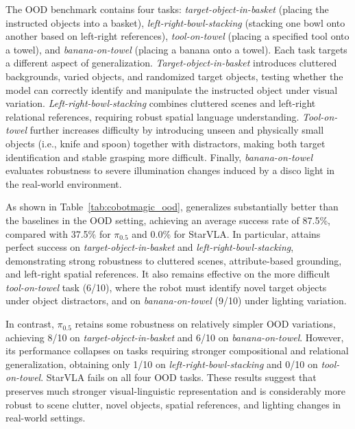 The OOD benchmark contains four tasks: \textit{target-object-in-basket} (placing the instructed objects into a basket), \textit{left-right-bowl-stacking} (stacking one bowl onto another based on left-right references), \textit{tool-on-towel} (placing a specified tool onto a towel), and \textit{banana-on-towel} (placing a banana onto a towel). Each task targets a different aspect of generalization. \textit{Target-object-in-basket} introduces cluttered backgrounds, varied objects, and randomized target objects, testing whether the model can correctly identify and manipulate the instructed object under visual variation. \textit{Left-right-bowl-stacking} combines cluttered scenes and left-right relational references, requiring robust spatial language understanding. \textit{Tool-on-towel} further increases difficulty by introducing unseen and physically small objects (i.e., knife and spoon) together with distractors, making both target identification and stable grasping more difficult. Finally, \textit{banana-on-towel} evaluates robustness to severe illumination changes induced by a disco light in the real-world environment.

As shown in Table~\ref{tab:cobotmagic_ood}, \ours generalizes substantially better than the baselines in the OOD setting, achieving an average success rate of 87.5\%, compared with 37.5\% for $\pi_{0.5}$ and 0.0\% for StarVLA. In particular, \ours attains perfect success on \textit{target-object-in-basket} and \textit{left-right-bowl-stacking}, demonstrating strong robustness to cluttered scenes, attribute-based grounding, and left-right spatial references. It also remains effective on the more difficult \textit{tool-on-towel} task (6/10), where the robot must identify novel target objects under object distractors, and on \textit{banana-on-towel} (9/10) under lighting variation.

In contrast, $\pi_{0.5}$ retains some robustness on relatively simpler OOD variations, achieving 8/10 on \textit{target-object-in-basket} and 6/10 on \textit{banana-on-towel}. However, its performance collapses on tasks requiring stronger compositional and relational generalization, obtaining only 1/10 on \textit{left-right-bowl-stacking} and 0/10 on \textit{tool-on-towel}. StarVLA fails on all four OOD tasks. These results suggest that \ours preserves much stronger visual-linguistic representation and is considerably more robust to scene clutter, novel objects, spatial references, and lighting changes in real-world settings.





